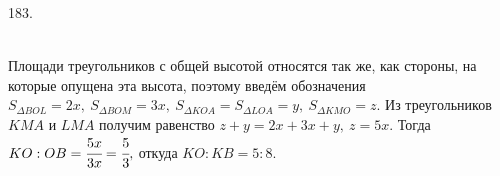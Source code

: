 183. \begin{figure}[ht!]
\end{figure}\\
Площади треугольников с общей высотой относятся так же, как стороны, на которые опущена эта высота, поэтому введём обозначения $S_{\Delta BOL}=2x,\ S_{\Delta BOM}=3x,\ S_{\Delta KOA}=S_{\Delta LOA}=y,\ S_{\Delta KMO}=z.$ Из треугольников $KMA$ и $LMA$ получим равенство $z+y=2x+3x+y,\ z=5x.$ Тогда $KO:OB=\cfrac{5x}{3x}=\cfrac{5}{3},$ откуда $KO:KB=5:8.$\\
